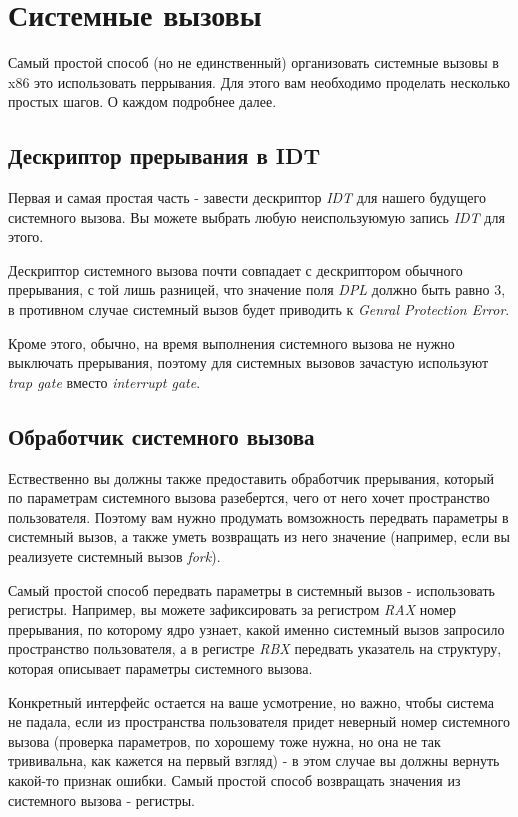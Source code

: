 \section{Системные вызовы}

Самый простой способ (но не единственный) организовать системные вызовы в x86
это использовать перрывания. Для этого вам необходимо проделать несколько простых
шагов. О каждом подробнее далее.

\subsection{Дескриптор прерывания в IDT}

Первая и самая простая часть - завести дескриптор \emph{IDT} для нашего будущего
системного вызова. Вы можете выбрать любую неиспользуюмую запись \emph{IDT} для
этого.

Дескриптор системного вызова почти совпадает с дескриптором обычного прерывания,
с той лишь разницей, что значение поля \emph{DPL} должно быть равно 3, в противном
случае системный вызов будет приводить к \emph{Genral Protection Error}.

Кроме этого, обычно, на время выполнения системного вызова не нужно выключать
прерывания, поэтому для системных вызовов зачастую используют \emph{trap gate}
вместо \emph{interrupt gate}.

\subsection{Обработчик системного вызова}

Ествественно вы должны также предоставить обработчик прерывания, который по
параметрам системного вызова разебертся, чего от него хочет пространство
пользователя. Поэтому вам нужно продумать вомзожность передвать параметры в
системный вызов, а также уметь возвращать из него значение (например, если
вы реализуете системный вызов \emph{fork}).

Самый простой способ передвать параметры в системный вызов - использовать
регистры. Например, вы можете зафиксировать за регистром \emph{RAX} номер
прерывания, по которому ядро узнает, какой именно системный вызов запросило
пространство пользователя, а в регистре \emph{RBX} передвать указатель на
структуру, которая описывает параметры системного вызова.

Конкретный интерфейс остается на ваше усмотрение, но важно, чтобы система не
падала, если из пространства пользователя придет неверный номер системного
вызова (проверка параметров, по хорошему тоже нужна, но она не так трививальна,
как кажется на первый взгляд) - в этом случае вы должны вернуть какой-то признак
ошибки. Самый простой способ возвращать значения из системного вызова - регистры.

